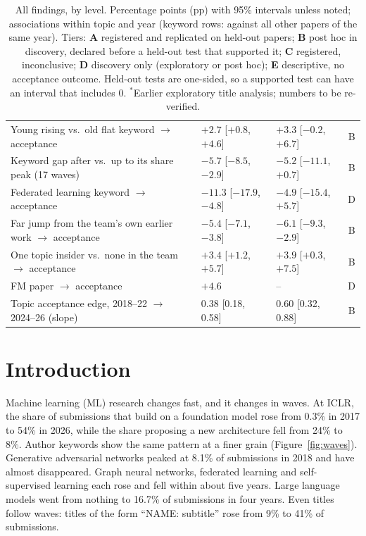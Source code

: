 \documentclass[11pt]{article}
\begin{document}
\begin{table}[t]
\begin{tabularx}{\textwidth}{@{}>{\raggedright\arraybackslash}X l l c@{}}
    Young rising vs.\ old flat keyword $\to$ acceptance & $+2.7$ [$+0.8$, $+4.6$] & $+3.3$ [$-0.2$, $+6.7$] & B \\
    Keyword gap after vs.\ up to its share peak (17 waves) & $-5.7$ [$-8.5$, $-2.9$] & $-5.2$ [$-11.1$, $+0.7$]
      & B \\
    Federated learning keyword $\to$ acceptance & $-11.3$ [$-17.9$, $-4.8$] & $-4.9$ [$-15.4$, $+5.7$] & D \\
    Far jump from the team's own earlier work $\to$ acceptance & $-5.4$ [$-7.1$, $-3.8$] & $-6.1$ [$-9.3$, $-2.9$]
      & B \\
    One topic insider vs.\ none in the team $\to$ acceptance & $+3.4$ [$+1.2$, $+5.7$] & $+3.9$ [$+0.3$, $+7.5$]
      & B \\
    FM paper $\to$ acceptance & $+4.6$ & -- & D \\
    Topic acceptance edge, 2018--22 $\to$ 2024--26 (slope) & 0.38 [0.18, 0.58] & 0.60 [0.32, 0.88] & B \\
    \bottomrule
  \end{tabularx}
  \caption{All findings, by level. Percentage points (pp) with 95\% intervals unless noted; associations within topic
  and year (keyword rows: against all other papers of the same year). Tiers: \textbf{A} registered and replicated on
  held-out papers; \textbf{B} post hoc in discovery, declared before a held-out test that supported it;
  \textbf{C} registered, inconclusive; \textbf{D} discovery only (exploratory or post hoc); \textbf{E} descriptive,
  no acceptance outcome. Held-out tests are one-sided, so a supported test can have an interval that includes 0.
  $^*$Earlier exploratory title analysis; numbers to be re-verified.}
  \label{tab:findings}
\end{table}

\section{Introduction}

Machine learning (ML) research changes fast, and it changes in waves. At ICLR, the share of submissions that build on
a foundation model rose from 0.3\% in 2017 to 54\% in 2026, while the share proposing a new architecture fell from
24\% to 8\%. Author keywords show the same pattern at a finer grain (Figure~\ref{fig:waves}). Generative adversarial
networks peaked at 8.1\% of submissions in 2018 and have almost disappeared. Graph neural networks, federated learning
and self-supervised learning each rose and fell within about five years. Large language models went from nothing to
16.7\% of submissions in four years. Even titles follow waves: titles of the form ``NAME: subtitle'' rose from 9\% to
41\% of submissions.
\end{document}
